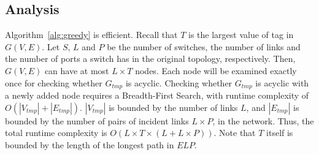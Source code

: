 \subsection {Analysis}
\label{subsec:caveats}




 Algorithm~\ref{alg:greedy} is efficient. Recall that
$T$ is the largest value of tag in $G(V,E)$. Let $S$, $L$ and $P$ be the number 
of switches, the number of links and the number of ports a switch has in the
original topology, respectively. Then, $G(V,E)$ can have at most $L \times T$
nodes.  Each node will be examined exactly once for checking whether $G_{tmp}$
is acyclic.  Checking whether $G_{tmp}$ is acyclic with a newly added node
requires a Breadth-First Search, with runtime complexity of $O(|V_{tmp}| +
|E_{tmp}|)$. $|V_{tmp}|$ is bounded by the number of links $L$, and $|E_{tmp}|$ 
is bounded by the number of pairs of incident links $L \times P$, in the network. Thus,
the total runtime complexity is $O(L \times T \times (L+L \times P))$. Note that $T$
itself is bounded by the length of the longest path in $ELP$.









